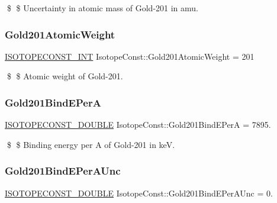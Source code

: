 \$ \$ Uncertainty in atomic mass of Gold-\/201 in amu. \mbox{\label{group___isotope_const-_gold-_au201_gafd7429f95e92c4e70902b8262e4a58ec}} 
\subsubsection{\texorpdfstring{Gold201\+Atomic\+Weight}{Gold201AtomicWeight}}
{\footnotesize\ttfamily \mbox{\hyperlink{group___isotope_const-_macros_ga5f18360b3e99483a35c32d789e62621c}{I\+S\+O\+T\+O\+P\+E\+C\+O\+N\+S\+T\+\_\+\+I\+NT}} Isotope\+Const\+::\+Gold201\+Atomic\+Weight = 201}

\$ \$ Atomic weight of Gold-\/201. \mbox{\label{group___isotope_const-_gold-_au201_ga8e82317726fdcf38228149f54c7d6e30}} 
\subsubsection{\texorpdfstring{Gold201\+Bind\+E\+PerA}{Gold201BindEPerA}}
{\footnotesize\ttfamily \mbox{\hyperlink{group___isotope_const-_macros_ga8f45a7272ce02c0b4c65c44636ed719a}{I\+S\+O\+T\+O\+P\+E\+C\+O\+N\+S\+T\+\_\+\+D\+O\+U\+B\+LE}} Isotope\+Const\+::\+Gold201\+Bind\+E\+PerA = 7895.}

\$ \$ Binding energy per A of Gold-\/201 in keV. \mbox{\label{group___isotope_const-_gold-_au201_gafa2da24749b598b4102e8cb7e5f9e24b}} 
\subsubsection{\texorpdfstring{Gold201\+Bind\+E\+Per\+A\+Unc}{Gold201BindEPerAUnc}}
{\footnotesize\ttfamily \mbox{\hyperlink{group___isotope_const-_macros_ga8f45a7272ce02c0b4c65c44636ed719a}{I\+S\+O\+T\+O\+P\+E\+C\+O\+N\+S\+T\+\_\+\+D\+O\+U\+B\+LE}} Isotope\+Const\+::\+Gold201\+Bind\+E\+Per\+A\+Unc = 0.}

